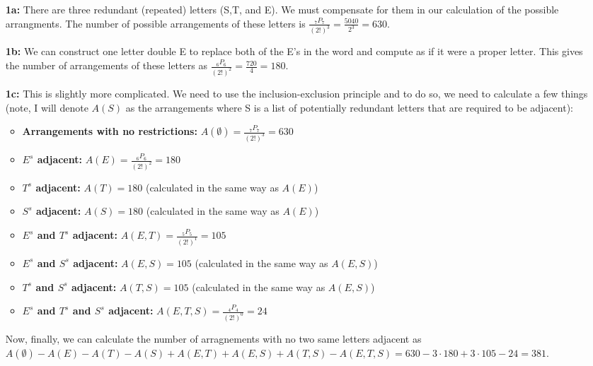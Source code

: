 \documentclass[12pt]{amsart}
\begin{document}
\begin{solution}
\begin{itemize}
	\item[\textbf{1a:}] There are three redundant (repeated) letters (S,T, and E).  We must compensate for them in our calculation of the possible arrangments.  The number of possible arrangements of these letters is $\frac{_7P_7}{(2!)^3} = \frac{5040}{2^3} = 630$.
	\item[\textbf{1b:}] We can construct one letter double E to replace both of the E's in the word and compute as if it were a proper letter.  This gives the number of arrangements of these letters as $\frac{_6P_6}{(2!)^2} = \frac{720}{4} = 180$.
	\item[\textbf{1c:}] This is slightly more complicated. We need to use the inclusion-exclusion principle and to do so, we need to calculate a few things (note, I will denote $A(S)$ as the arrangements where S is a list of potentially redundant letters that are required to be adjacent):
		\begin{itemize}
			\item{\textbf{Arrangements with no restrictions:}} $A(\emptyset) = \frac{_7P_7}{(2!)^3} = 630$
			\item{\textbf{$E^s$ adjacent:}} $A(E) = \frac{_6P_6}{(2!)^2} = 180$
			\item{\textbf{$T^s$ adjacent:}} $A(T) = 180$ (calculated in the same way as $A(E)$)
			\item{\textbf{$S^s$ adjacent:}} $A(S) = 180$ (calculated in the same way as $A(E)$)
			\item{\textbf{$E^s$ and $T^s$ adjacent:}} $A(E,T) = \frac{_5P_5}{(2!)^1} = 105$
			\item{\textbf{$E^s$ and $S^s$ adjacent:}} $A(E,S) = 105$ (calculated in the same way as $A(E,S)$)
			\item{\textbf{$T^s$ and $S^s$ adjacent:}} $A(T,S) = 105$ (calculated in the same way as $A(E,S)$)
			\item{\textbf{$E^s$ and $T^s$ and $S^s$ adjacent:}} $A(E,T,S) = \frac{_4P_4}{(2!)^0} = 24$
		\end{itemize}
		Now, finally, we can calculate the number of arragnements with no two same letters adjacent as $A(\emptyset) - A(E) - A(T) - A(S) + A(E,T) + A(E,S) + A(T,S) - A(E,T,S) = 630 - 3\cdot180 + 3\cdot105 - 24 = 381$.
\end{itemize}
\end{solution}

\end{document}
